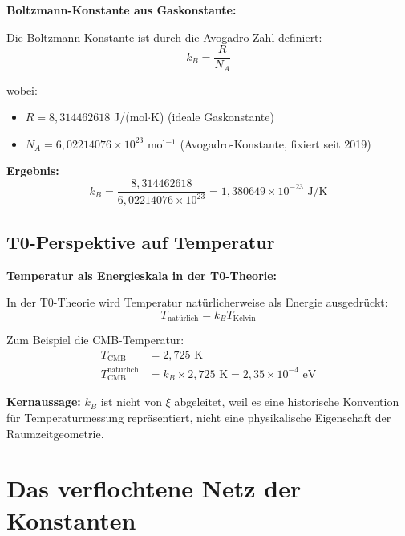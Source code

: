 \documentclass[12pt,a4paper]{article}
\begin{document}
\begin{keyresult}
\textbf{Boltzmann-Konstante aus Gaskonstante:}

Die Boltzmann-Konstante ist durch die Avogadro-Zahl definiert:
\begin{equation}
k_B = \frac{R}{N_A}
\end{equation}

wobei:
\begin{itemize}
\item $R = 8{,}314462618$ J/(mol$\cdot$K) (ideale Gaskonstante)
\item $N_A = 6{,}02214076 \times 10^{23}$ mol$^{-1}$ (Avogadro-Konstante, fixiert seit 2019)
\end{itemize}

\textbf{Ergebnis:}
\begin{equation}
k_B = \frac{8{,}314462618}{6{,}02214076 \times 10^{23}} = 1{,}380649 \times 10^{-23} \text{ J/K}
\end{equation}
\end{keyresult}

\subsection{T0-Perspektive auf Temperatur}

\begin{insight}
\textbf{Temperatur als Energieskala in der T0-Theorie:}

In der T0-Theorie wird Temperatur nat{\"u}rlicherweise als Energie ausgedr{\"u}ckt:
\begin{equation}
T_{\text{nat{\"u}rlich}} = k_B T_{\text{Kelvin}}
\end{equation}

Zum Beispiel die CMB-Temperatur:
\begin{align}
T_{\text{CMB}} &= 2{,}725 \text{ K} \\
T_{\text{CMB}}^{\text{nat{\"u}rlich}} &= k_B \times 2{,}725 \text{ K} = 2{,}35 \times 10^{-4} \text{ eV}
\end{align}

\textbf{Kernaussage:} $k_B$ ist nicht von $\xi$ abgeleitet, weil es eine historische Konvention f{\"u}r Temperaturmessung repr{\"a}sentiert, nicht eine physikalische Eigenschaft der Raumzeitgeometrie.
\end{insight}

\section{Das verflochtene Netz der Konstanten}
\end{document}
